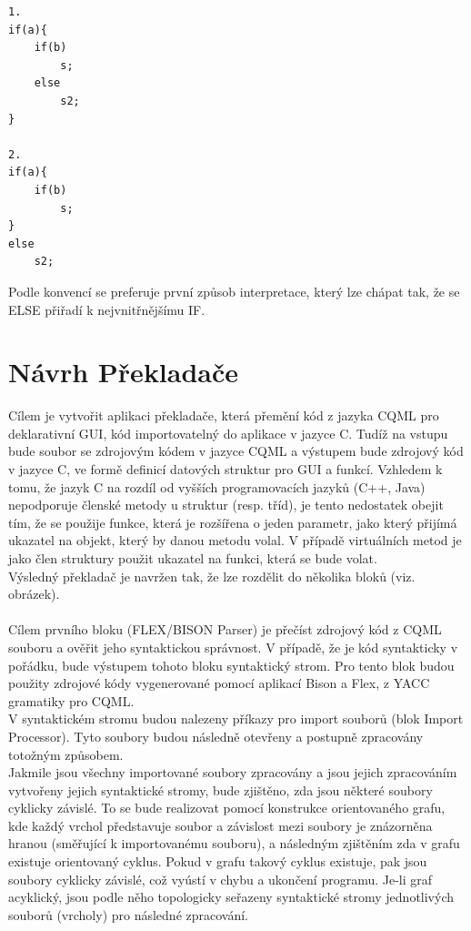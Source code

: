 \documentclass[report,11pt]{elsarticle}
\begin{document}
\begin{lstlisting}[frame=single,caption=Možnosti interpretace víceznačného výroku IF-ELSE]
1.
if(a){
	if(b)
		s;
	else
		s2;
}

2.
if(a){
	if(b)
		s;
}
else
	s2;
\end{lstlisting}
Podle konvencí se preferuje první způsob interpretace, který lze chápat tak, že se ELSE přiřadí k nejvnitřnějšímu IF.



\section{\label{SEC:Intro}Návrh Překladače}
Cílem je vytvořit aplikaci překladače, která přemění kód z jazyka CQML pro deklarativní GUI, kód importovatelný do aplikace v jazyce C. Tudíž na vstupu bude soubor se zdrojovým kódem v jazyce CQML a výstupem bude zdrojový kód v jazyce C, ve formě definicí datových struktur pro GUI a funkcí. Vzhledem k tomu, že jazyk C na rozdíl od vyšších programovacích jazyků (C++, Java) nepodporuje členské metody u struktur (resp. tříd), je tento nedostatek obejit tím, že se použije funkce, která je rozšířena o jeden parametr, jako který přijímá ukazatel na objekt, který by danou metodu volal. V případě virtuálních metod je jako člen struktury použit ukazatel na funkci, která se bude volat.\\
Výsledný překladač je navržen tak, že lze rozdělit do několika bloků (viz. obrázek).\\
\\
Cílem prvního bloku (FLEX/BISON Parser) je přečíst zdrojový kód z CQML souboru a ověřit jeho syntaktickou správnost. V případě, že je kód syntakticky v pořádku, bude výstupem tohoto bloku syntaktický strom. Pro tento blok budou použity zdrojové kódy vygenerované pomocí aplikací Bison a Flex, z YACC gramatiky pro CQML.\\
V syntaktickém stromu budou nalezeny příkazy pro import souborů (blok Import Processor). Tyto soubory budou následně otevřeny a postupně zpracovány totožným způsobem.\\
Jakmile jsou všechny importované soubory zpracovány a jsou jejich zpracováním vytvořeny jejich syntaktické stromy, bude zjištěno, zda jsou některé soubory cyklicky závislé. To se bude realizovat pomocí konstrukce orientovaného grafu, kde každý vrchol představuje soubor a závislost mezi soubory je znázorněna hranou (směřující k importovanému souboru), a následným zjištěním zda v grafu existuje orientovaný cyklus. Pokud v grafu takový cyklus existuje, pak jsou soubory cyklicky závislé, což vyústí v chybu a ukončení programu. Je-li graf acyklický, jsou podle něho topologicky seřazeny syntaktické stromy jednotlivých souborů (vrcholy) pro následné zpracování.\\
\end{document}
